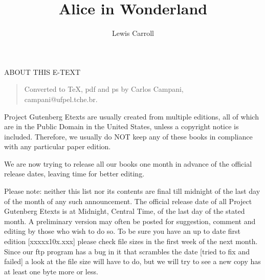 \documentclass[12pt]{book}
\title{Alice in Wonderland}
\author{Lewis Carroll}
\date{}
\begin{document}
\maketitle

\begin{center}
{\Large ABOUT THIS E-TEXT}
\end{center}

\noindent {}

\begin{verse}
Converted to \TeX, pdf and ps by Carlos Campani, \\
 campani@ufpel.tche.br.
\end{verse}

\newpage

Project Gutenberg Etexts are usually created from multiple editions,
all of which are in the Public Domain in the United States, unless a
copyright notice is included.  Therefore, we usually do NOT keep any
of these books in compliance with any particular paper edition.


We are now trying to release all our books one month in advance
of the official release dates, leaving time for better editing.

Please note:  neither this list nor its contents are final till
midnight of the last day of the month of any such announcement.
The official release date of all Project Gutenberg Etexts is at
Midnight, Central Time, of the last day of the stated month.  A
preliminary version may often be posted for suggestion, comment
and editing by those who wish to do so.  To be sure you have an
up to date first edition [xxxxx10x.xxx] please check file sizes
in the first week of the next month.  Since our ftp program has
a bug in it that scrambles the date [tried to fix and failed] a
look at the file size will have to do, but we will try to see a
new copy has at least one byte more or less.
\end{document}
